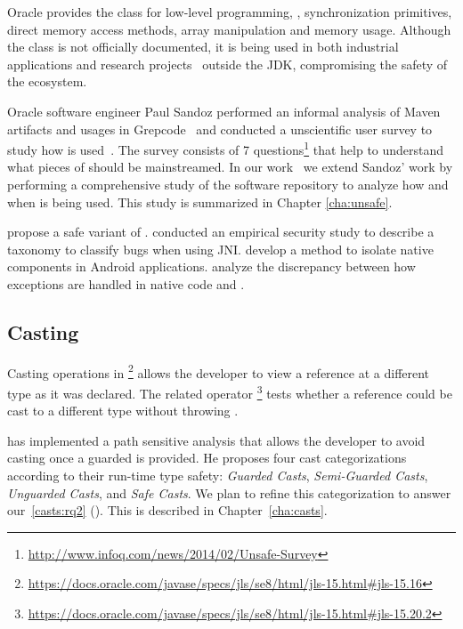 Oracle provides the \smu{} class for low-level programming,
\eg, synchronization primitives, direct memory access methods,
array manipulation and memory usage.
Although the \smu{} class is not officially documented,
it is being used in both industrial applications
and research projects~\citep{korlandNoninvasiveConcurrencyJava2010,pukallFlexibleDynamicSoftware,gligoricCoDeSeFastDeserialization2011}
outside the JDK, compromising the safety of the \java{} ecosystem.

Oracle software engineer Paul Sandoz performed an informal analysis of
Maven artifacts and usages in Grepcode~\citep{sandoz-personal-communication}
and conducted a unscientific user survey to study how \unsafe{} is used~\citep{psandoz14}.
The survey consists of 7 questions\footnote{\url{http://www.infoq.com/news/2014/02/Unsafe-Survey}} 
that help to understand what pieces of \smu{} should be mainstreamed.
In our work~\citep{mastrangeloUseYourOwn2015} we extend Sandoz' work
by performing a comprehensive study of the \mavencentral{}
software repository to analyze how and when \smu{} is being used.
This study is summarized in Chapter \ref{cha:unsafe}.

\cite{tanSafeJavaNative2006} propose a safe variant of \jni{}.
\cite{tanEmpiricalSecurityStudy2008,kondohFindingBugsJava2008} conducted an empirical security study to describe a taxonomy to classify bugs when using JNI.
\cite{sunNativeGuardProtectingAndroid2014} develop a method to isolate native components in Android applications.
\cite{liFindingBugsExceptional2009} analyze the discrepancy between how exceptions are handled in native code and \java{}.

\subsection{Casting}
\label{sec:literature-review:casting}

Casting operations in \java{}%
\footnote{\url{https://docs.oracle.com/javase/specs/jls/se8/html/jls-15.html\#jls-15.16}}
allows the developer to view a reference at a different type as it was declared.
The related  operator%
\footnote{\url{https://docs.oracle.com/javase/specs/jls/se8/html/jls-15.html\#jls-15.20.2}}
tests whether a reference could be cast to a different type without
throwing .

\cite{wintherGuardedTypePromotion2011} has implemented a
path sensitive analysis that allows the developer to avoid casting
once a guarded  is provided.
He proposes four cast categorizations according to their
run-time type safety:
\emph{Guarded Casts}, \emph{Semi-Guarded Casts},
\emph{Unguarded Casts}, and \emph{Safe Casts}.
We plan to refine this categorization to answer
our~\ref{casts:rq2} (\emph{\crqB}).
This is described in Chapter~\ref{cha:casts}.

